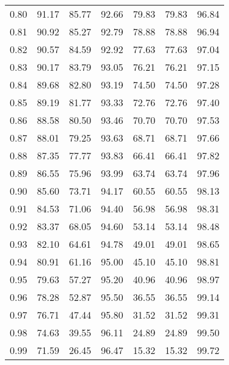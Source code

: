 \begin{tabular}{|c|c|c|c|c|c|c|}
      0.80 &     91.17 &     85.77 &      92.66 &   79.83 &      79.83 &         96.84 \\
      0.81 &     90.92 &     85.27 &      92.79 &   78.88 &      78.88 &         96.94 \\
      0.82 &     90.57 &     84.59 &      92.92 &   77.63 &      77.63 &         97.04 \\
      0.83 &     90.17 &     83.79 &      93.05 &   76.21 &      76.21 &         97.15 \\
      0.84 &     89.68 &     82.80 &      93.19 &   74.50 &      74.50 &         97.28 \\
      0.85 &     89.19 &     81.77 &      93.33 &   72.76 &      72.76 &         97.40 \\
      0.86 &     88.58 &     80.50 &      93.46 &   70.70 &      70.70 &         97.53 \\
      0.87 &     88.01 &     79.25 &      93.63 &   68.71 &      68.71 &         97.66 \\
      0.88 &     87.35 &     77.77 &      93.83 &   66.41 &      66.41 &         97.82 \\
      0.89 &     86.55 &     75.96 &      93.99 &   63.74 &      63.74 &         97.96 \\
      0.90 &     85.60 &     73.71 &      94.17 &   60.55 &      60.55 &         98.13 \\
      0.91 &     84.53 &     71.06 &      94.40 &   56.98 &      56.98 &         98.31 \\
      0.92 &     83.37 &     68.05 &      94.60 &   53.14 &      53.14 &         98.48 \\
      0.93 &     82.10 &     64.61 &      94.78 &   49.01 &      49.01 &         98.65 \\
      0.94 &     80.91 &     61.16 &      95.00 &   45.10 &      45.10 &         98.81 \\
      0.95 &     79.63 &     57.27 &      95.20 &   40.96 &      40.96 &         98.97 \\
      0.96 &     78.28 &     52.87 &      95.50 &   36.55 &      36.55 &         99.14 \\
      0.97 &     76.71 &     47.44 &      95.80 &   31.52 &      31.52 &         99.31 \\
      0.98 &     74.63 &     39.55 &      96.11 &   24.89 &      24.89 &         99.50 \\
      0.99 &     71.59 &     26.45 &      96.47 &   15.32 &      15.32 &         99.72 \\
\bottomrule
\end{tabular}

